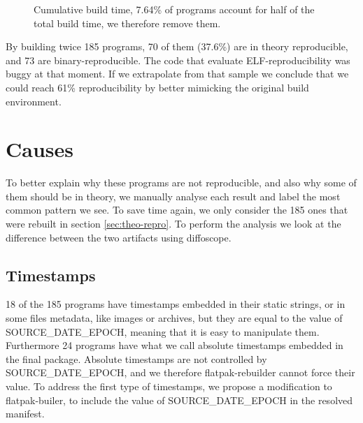 \documentclass[a4paper,11pt,oneside]{report}
\theoremstyle{definition}
\newcommand{\sysname}{flatpak-rebuilder\xspace}
\newcommand{\fb}{flatpak-builer\xspace}
\newcommand{\sde}{SOURCE\_DATE\_EPOCH\xspace}
\newcommand{\dfc}{diffoscope\xspace}
\begin{document}
\begin{figure}[h]
    \caption{Cumulative build time, 7.64\% of programs
    account for half of the total build time, we therefore remove them.}
    \label{fig:buildtime}
\end{figure}

By building twice 185 programs, 70 of them (37.6\%) are in theory reproducible,
and 73 are binary-reproducible. The code that evaluate ELF-reproducibility was
buggy at that moment. If we extrapolate from that sample we conclude that we
could reach 61\% reproducibility by better mimicking the original build
environment.

\section{Causes}
To better explain why these programs are not reproducible, and also why some of
them should be in theory, we manually analyse each result and label the most
common pattern we see. To save time again, we only consider the 185 ones that
were rebuilt in section \autoref{sec:theo-repro}. To perform the analysis we
look at the difference between the two artifacts using \dfc.

\subsection*{Timestamps}
18 of the 185 programs have timestamps embedded in their static strings, or in
some files metadata, like images or archives, but they are equal to the value
of \sde, meaning that it is easy to manipulate them. Furthermore 24 programs
have what we call absolute timestamps embedded in the final package. Absolute
timestamps are not controlled by \sde, and we therefore \sysname cannot force
their value. To address the first type of timestamps, we propose a modification
to \fb, to include the value of \sde in the resolved manifest.
\end{document}
